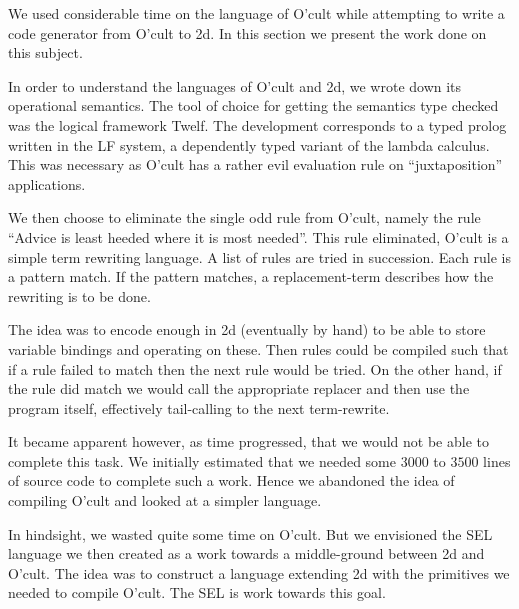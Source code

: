 
We used considerable time on the language of O'cult while attempting
to write a code generator from O'cult to 2d. In this section we
present the work done on this subject.

In order to understand the languages of O'cult and 2d, we wrote down
its operational semantics. The tool of choice for getting the
semantics type checked was the logical framework Twelf. The
development corresponds to a typed prolog written in the LF system, a
dependently typed variant of the lambda calculus. This was necessary
as O'cult has a rather evil evaluation rule on ``juxtaposition''
applications.

We then choose to eliminate the single odd rule from O'cult, namely
the rule ``Advice is least heeded where it is most needed''. This rule
eliminated, O'cult is a simple term rewriting language. A list of
rules are tried in succession. Each rule is a pattern match. If the
pattern matches, a replacement-term describes how the rewriting is to
be done.

The idea was to encode enough in 2d (eventually by hand) to be able to
store variable bindings and operating on these. Then rules could be
compiled such that if a rule failed to match then the next rule would
be tried. On the other hand, if the rule did match we would call the
appropriate replacer and then use the program itself, effectively
tail-calling to the next term-rewrite.

It became apparent however, as time progressed, that we would not be
able to complete this task. We initially estimated that we needed some
$3000$ to $3500$ lines of source code to complete such a work. Hence
we abandoned the idea of compiling O'cult and looked at a simpler
language.

In hindsight, we wasted quite some time on O'cult. But we envisioned
the SEL language we then created as a work towards a middle-ground
between 2d and O'cult. The idea was to construct a language extending
2d with the primitives we needed to compile O'cult. The SEL is work
towards this goal.

